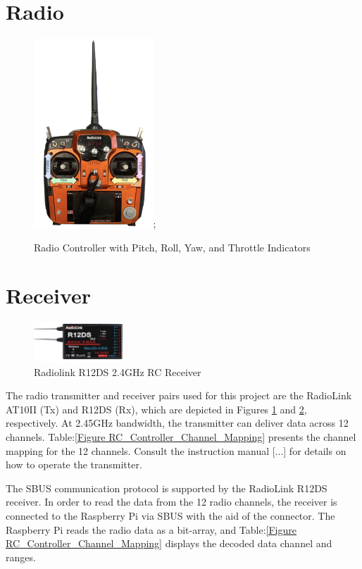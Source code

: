 \documentclass{report}
\begin{document}
\section{Radio}\label{radio}
\begin{figure}[H]
  \centering
  \includegraphics[width=0.4\textwidth]{Pictures/radio.jpg};
  \caption{Radio Controller with Pitch, Roll, Yaw, and Throttle Indicators}
  \label{fig:radio_controller}
\end{figure}
\section{Receiver}
\begin{figure}[H]
  \centering
  \includegraphics[width=0.3\textwidth]{Pictures/reciever.png}
  \caption{Radiolink R12DS 2.4GHz RC Receiver}
  \label{fig:receiver}
\end{figure}
The radio transmitter and receiver pairs used for this project are the RadioLink
AT10II (Tx) and R12DS (Rx), which are depicted in Figures
\ref{fig:radio_controller} and \ref{fig:receiver}, respectively. At 2.45GHz
bandwidth, the transmitter can deliver data across 12 channels.
Table:\ref{Figure RC_Controller_Channel_Mapping} presents the channel mapping
for the 12 channels. Consult the instruction manual [...] for details on how to
operate the transmitter.

The SBUS communication protocol is supported by the RadioLink R12DS receiver. In
order to read the data from the 12 radio channels, the receiver is connected to
the Raspberry Pi via SBUS with the aid of the connector. The Raspberry Pi reads
the radio data as a bit-array, and
Table:\ref{Figure RC_Controller_Channel_Mapping} displays the decoded data
channel and ranges.
\end{document}
